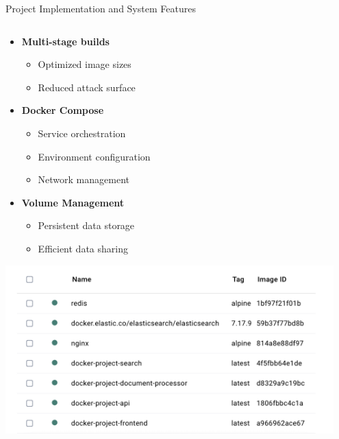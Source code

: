 \documentclass[notes]{beamer}
\begin{document}
{
\begin{frame}[fragile]{Project Implementation and System Features}
    \begin{columns}[T]
        \begin{column}{0.48\textwidth}
            \begin{itemize}
                \item \textbf{Multi-stage builds}
                \begin{itemize}\small
                    \item Optimized image sizes
                    \item Reduced attack surface
                \end{itemize}

                \vspace{0.2cm}
                
                \item \textbf{Docker Compose}
                \begin{itemize}\small
                    \item Service orchestration
                    \item Environment configuration
                    \item Network management
                \end{itemize}

                \vspace{0.2cm}
                
                \item \textbf{Volume Management}
                \begin{itemize}\small
                    \item Persistent data storage
                    \item Efficient data sharing
                \end{itemize}
                
            \end{itemize}

            \includegraphics[width=0.95\textwidth,height=0.7\textheight,keepaspectratio]{docker_screenshot.png}
        \end{column}
        

\end{columns}
\end{frame}}
\end{document}
